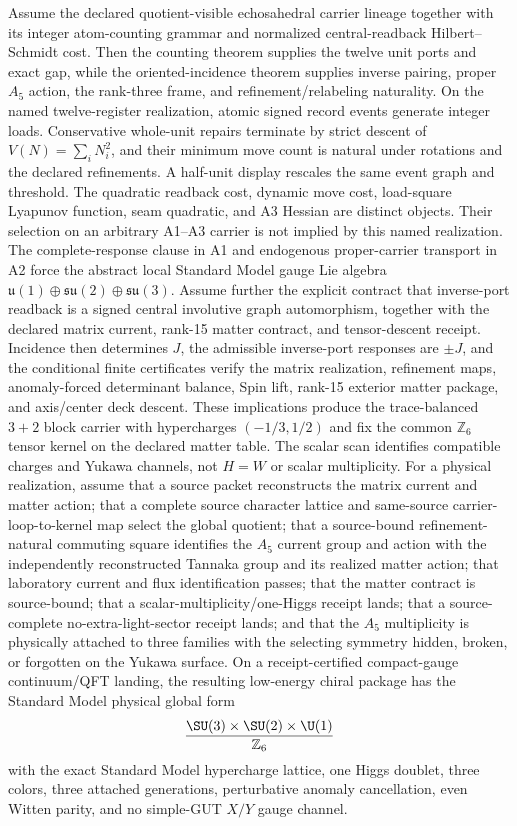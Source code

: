 \begin{theorem}
\label{thm:conditional-screen-sm-forcing}
Assume the declared quotient-visible echosahedral carrier lineage together
with its integer atom-counting grammar and normalized central-readback
Hilbert--Schmidt cost. Then the counting theorem supplies the twelve unit
ports and exact gap, while the oriented-incidence theorem supplies inverse
pairing, proper \(A_5\) action, the rank-three frame, and
refinement/relabeling naturality. On the named twelve-register realization,
atomic signed record events generate integer loads. Conservative whole-unit
repairs terminate by strict descent of \(V(N)=\sum_iN_i^2\), and their minimum
move count is natural under rotations and the declared refinements. A
half-unit display rescales the same event graph and threshold. The quadratic
readback cost, dynamic move cost, load-square Lyapunov function, seam
quadratic, and A3 Hessian are distinct objects. Their selection on an arbitrary
A1--A3 carrier is not implied by this named realization.
The complete-response clause in A1 and endogenous proper-carrier transport in
A2 force the abstract local Standard Model gauge Lie algebra
\(\mathfrak u(1)\oplus\mathfrak{su}(2)\oplus\mathfrak{su}(3)\).
Assume further the explicit contract that inverse-port readback is a signed
central involutive graph automorphism, together with the declared matrix
current, rank-15 matter contract, and tensor-descent receipt. Incidence then
determines \(J\), the admissible inverse-port responses are \(\pm J\), and the
conditional finite certificates verify the matrix realization, refinement
maps, anomaly-forced determinant balance, Spin lift, rank-15 exterior matter
package, and axis/center deck descent. These implications produce the
trace-balanced \(3+2\) block carrier with hypercharges
\((-1/3,1/2)\) and fix the common \(\mathbb Z_6\) tensor kernel on the
declared matter table. The scalar scan identifies compatible charges and Yukawa
channels, not \(H=W\) or scalar multiplicity. For a physical realization, assume
that a
source packet reconstructs the matrix current and matter action; that a
complete source character lattice and same-source carrier-loop-to-kernel map
select the global quotient; that a
source-bound refinement-natural commuting square identifies the \(A_5\)
current group and action with the independently reconstructed Tannaka group
and its realized matter action; that laboratory current and flux
identification passes; that the matter contract is source-bound; that a
scalar-multiplicity/one-Higgs receipt lands; that a source-complete
no-extra-light-sector receipt lands; and that the \(A_5\) multiplicity is physically attached to three families with
the selecting symmetry hidden, broken, or forgotten on the Yukawa surface.
On a receipt-certified compact-gauge continuum/QFT landing,
the resulting low-energy chiral package has the Standard Model physical
global form
\[
\frac{\SU(3)\times\SU(2)\times\U(1)}{\mathbb Z_6}
\]
with the exact Standard Model hypercharge lattice, one Higgs doublet, three
colors, three attached generations, perturbative anomaly cancellation, even
Witten parity, and no simple-GUT \(X/Y\) gauge channel.
\end{theorem}

